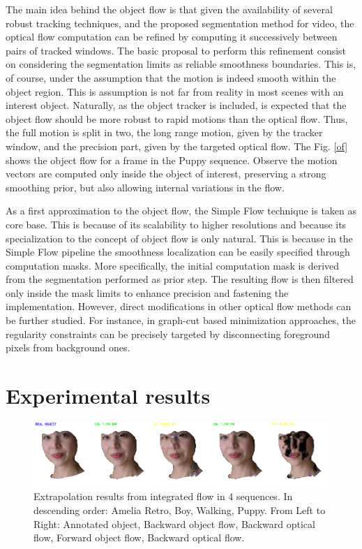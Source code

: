 The main idea behind the object flow is that given the availability of several robust tracking techniques, and the proposed
segmentation method for video, the optical flow computation can be refined by computing it successively between pairs
of tracked windows. The basic proposal to perform this refinement consist on considering the segmentation limits  as reliable smoothness boundaries. 
This is, of course, under the assumption that the motion is indeed smooth within the object region. 
This is assumption is not far from reality in most scenes with an interest object. 
Naturally, as the object tracker is included, is expected that the object flow should be more robust to rapid motions than the
optical flow. 
Thus, the full motion is split in two, the long range motion, given by the tracker window, and the precision part, given by the targeted optical flow. The Fig. \ref{of} shows 
the object flow for a frame in the Puppy sequence. Observe the motion vectors are computed only inside the object of interest, preserving a strong smoothing prior, but 
also allowing internal variations in the flow. 

As a first approximation to the object flow, the Simple Flow technique \cite{c21} is taken as core base. This is because of its scalability 
to higher resolutions and because its specialization to the concept of object flow is only natural. This is because in the Simple Flow pipeline 
the smoothness localization can be easily specified through computation masks. More specifically, the initial computation mask is derived from 
the segmentation performed as prior step. The resulting flow is then filtered only inside the mask limits to enhance precision and fastening the 
implementation. However, direct modifications in other optical flow methods can be further studied. For instance, in graph-cut based 
minimization approaches, the regularity constraints can be precisely targeted by disconnecting foreground pixels from background ones.

\section{Experimental results}
   \begin{figure}[th]
      \centering
      \includegraphics[width=1.00\textwidth]{../images/extrapolated.png}
      \caption{Extrapolation results from integrated flow in 4 sequences. In descending order: Amelia Retro, Boy, Walking, Puppy. From Left to Right: Annotated object, Backward object flow, Backward optical flow, Forward object flow, Backward optical flow.}
      \label{sample}
   \end{figure}
	\setlength{\belowcaptionskip}{-10pt}

